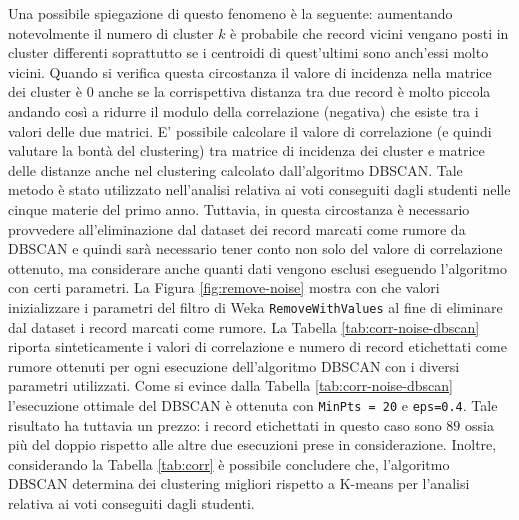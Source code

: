 \documentclass[12pt]{article}
\begin{document}
Una possibile spiegazione di questo fenomeno è la seguente: aumentando notevolmente il numero di cluster $k$ è probabile che record vicini vengano posti in cluster differenti soprattutto se i centroidi di quest'ultimi sono anch'essi molto vicini. Quando si verifica questa circostanza il valore di incidenza nella matrice dei cluster è $0$ anche se la corrispettiva distanza tra due record è molto piccola andando così a ridurre il modulo della correlazione (negativa) che esiste tra i valori delle due matrici. E' possibile calcolare il valore di correlazione (e quindi valutare la bontà del clustering) tra matrice di incidenza dei cluster e matrice delle distanze anche nel clustering calcolato dall'algoritmo DBSCAN. Tale metodo è stato utilizzato nell'analisi relativa ai voti conseguiti dagli studenti nelle cinque materie del primo anno. Tuttavia, in questa circostanza è necessario provvedere all'eliminazione dal dataset dei record marcati come rumore da DBSCAN e quindi sarà necessario tener conto non solo del valore di correlazione ottenuto, ma considerare anche quanti dati vengono esclusi eseguendo l'algoritmo con certi parametri. La Figura \ref{fig:remove-noise} mostra con che valori inizializzare i parametri del filtro di Weka \texttt{RemoveWithValues} al fine di eliminare dal dataset i record marcati come rumore. La Tabella \ref{tab:corr-noise-dbscan} riporta sinteticamente i valori di correlazione e numero di record etichettati come rumore ottenuti per ogni esecuzione dell'algoritmo DBSCAN con i diversi parametri utilizzati. Come si evince dalla Tabella \ref{tab:corr-noise-dbscan} l'esecuzione ottimale del DBSCAN è ottenuta con \texttt{MinPts = 20} e \texttt{eps=0.4}. Tale risultato ha tuttavia un prezzo: i record etichettati in questo caso sono $89$ ossia più del doppio rispetto alle altre due esecuzioni prese in considerazione. Inoltre, considerando la Tabella \ref{tab:corr} è possibile concludere che, l'algoritmo DBSCAN determina dei clustering migliori rispetto a K-means per l'analisi relativa ai voti conseguiti dagli studenti.
\end{document}
